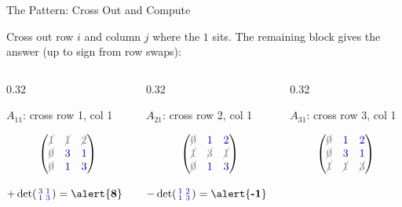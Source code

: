 \documentclass[10pt]{beamer}
\theoremstyle{definition}
\newcommand{\x}[1]{\alert{\textbf{#1}}}
\newcommand{\bl}[1]{{\color{blue!70!black}#1}}
\begin{document}
\begin{frame}[fragile]{The Pattern: Cross Out and Compute}

Cross out row $i$ and column $j$ where the $1$ sits. The remaining block gives the answer (up to sign from row swaps):

\vfill

\begin{columns}[T]
\begin{column}{0.32\textwidth}
\begin{center}
{\footnotesize $A_{11}$: cross row 1, col 1}

$$\begin{pmatrix} {\color{gray}\cancel{1}} & {\color{gray}\cancel{1}} & {\color{gray}\cancel{2}} \\ {\color{gray}\cancel{0}} & \bl{3} & \bl{1} \\ {\color{gray}\cancel{0}} & \bl{1} & \bl{3} \end{pmatrix}$$

$+\det\!\left(\begin{smallmatrix}\bl{3}&\bl{1}\\\bl{1}&\bl{3}\end{smallmatrix}\right) = \x{8}$
\end{center}
\end{column}
\begin{column}{0.32\textwidth}
\begin{center}
{\footnotesize $A_{21}$: cross row 2, col 1}

$$\begin{pmatrix} {\color{gray}\cancel{0}} & \bl{1} & \bl{2} \\ {\color{gray}\cancel{1}} & {\color{gray}\cancel{3}} & {\color{gray}\cancel{1}} \\ {\color{gray}\cancel{0}} & \bl{1} & \bl{3} \end{pmatrix}$$

$-\det\!\left(\begin{smallmatrix}\bl{1}&\bl{2}\\\bl{1}&\bl{3}\end{smallmatrix}\right) = \x{-1}$
\end{center}
\end{column}
\begin{column}{0.32\textwidth}
\begin{center}
{\footnotesize $A_{31}$: cross row 3, col 1}

$$\begin{pmatrix} {\color{gray}\cancel{0}} & \bl{1} & \bl{2} \\ {\color{gray}\cancel{0}} & \bl{3} & \bl{1} \\ {\color{gray}\cancel{1}} & {\color{gray}\cancel{1}} & {\color{gray}\cancel{3}} \end{pmatrix}$$


\end{center}
\end{column}
\end{columns}
\end{frame}
\end{document}
